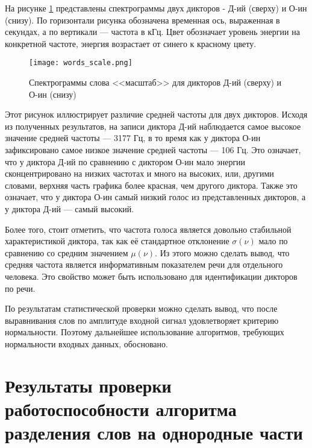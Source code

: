 На рисунке \ref{fig:words_scale} представлены спектрограммы двух дикторов - Д-ий (сверху) и О-ин (снизу).
По горизонтали рисунка обозначена временная ось, выраженная в секундах, а по вертикали --- частота в кГц.
Цвет обозначает уровень энергии на конкретной частоте, энергия возрастает от синего к красному цвету.

\begin{figure}[h]
	\centering
	\texttt{[image: words\_scale.png]}
	\caption{Спектрограммы слова <<масштаб>> для дикторов Д-ий (сверху) и О-ин (снизу)}
	\label{fig:words_scale}
\end{figure}

Этот рисунок иллюстрирует различие средней частоты для двух дикторов.
Исходя из полученных результатов, на записи диктора Д-ий наблюдается самое высокое значение средней частоты --- 3177 Гц, в то время как у диктора О-ин зафиксировано самое низкое значение средней частоты --- 106 Гц.
Это означает, что у диктора Д-ий по сравнению с диктором О-ин мало энергии сконцентрировано на низких частотах и много на высоких, или, другими словами, верхняя часть графика более красная, чем другого диктора.
Также это означает, что у диктора О-ин самый низкий голос из представленных дикторов, а у диктора Д-ий --- самый высокий.

Более того, стоит отметить, что частота голоса является довольно стабильной характеристикой диктора, так как её стандартное отклонение $\sigma(\nu)$ мало по сравнению со средним значением $\mu(\nu)$.
Из этого можно сделать вывод, что средняя частота является информативным показателем речи для отдельного человека.
Это свойство может быть использовано для идентификации дикторов по речи.

По результатам статистической проверки можно сделать вывод, что после выравнивания слов по амплитуде входной сигнал удовлетворяет критерию нормальности.
Поэтому дальнейшее использование алгоритмов, требующих нормальности входных данных, обосновано.


\section{Результаты проверки работоспособности алгоритма разделения слов на однородные части} \label{sect3_2}

